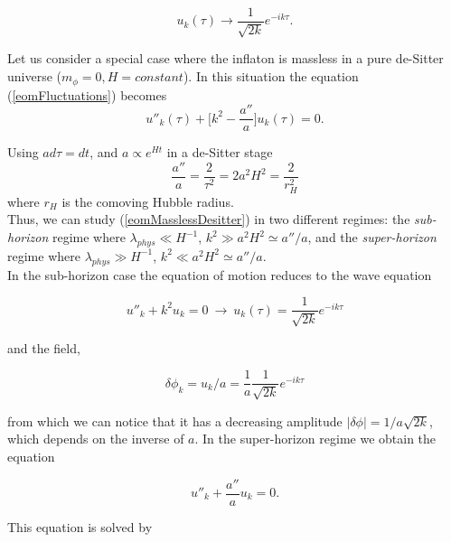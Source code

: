 \documentclass[11pt,a4paper,twoside]{book}
\begin{document}
 \begin{equation}
 	\label{planeWave}
 	u_{k}(\tau) \rightarrow \frac{1}{\sqrt{2k}}e^{-ik\tau}.
 \end{equation}

Let us consider a special case where the inflaton is massless in a pure de-Sitter universe ($m_{\phi} = 0, H=constant $). In this situation the equation (\ref{eomFluctuations}) becomes
\begin{equation}
\label{eomMasslessDesitter}
u''_{k}(\tau) + \Big[k^{2} - \frac{a''}{a}\Big]u_{k}(\tau) = 0.
\end{equation}

Using $a d\tau=dt$, and $ a \propto e^{Ht}$ in a de-Sitter stage 
\begin{equation}
	\label{horizon}
	\frac{a''}{a}= \frac{2}{\tau^{2}}=2a^{2}H^{2}=\frac{2}{r_{H}^{2}}
\end{equation}
where $ r_{H} $ is the comoving Hubble radius.\\
Thus, we can study (\ref{eomMasslessDesitter}) in two different regimes: the \textit{sub-horizon} regime where $ \lambda_{phys} \ll H^{-1} $, $ k^{2} \gg a^{2}H^{2} \simeq a''/a $, and the \textit{super-horizon} regime where $ \lambda_{phys} \gg H^{-1} $, $ k^{2} \ll a^{2}H^{2} \simeq a''/a $.\\
In the sub-horizon case the equation of motion reduces to the wave equation

\begin{equation}
\label{waveEquationFluctuation}
u''_{k} + k^{2}u_{k}=0\  \rightarrow\  u_{k}(\tau)= \frac{1}{\sqrt{2k}}e^{-ik\tau} 
\end{equation}

and the field,

\begin{equation}
	\label{fieldSubHorizon}
	 \delta\phi_{k}=u_{k}/a=\frac{1}{a}\frac{1}{\sqrt{2k}}e^{-ik\tau}
\end{equation}

from which we can notice that it has a decreasing amplitude $ |\delta\phi| = 1/a\sqrt{2k} $, which depends on the inverse of $ a $.
In the super-horizon regime we obtain the equation

\begin{equation}
	\label{superHorizon}
	u''_{k} + \frac{a''}{a}u_{k}=0.
\end{equation}

This equation is solved by
\end{document}
